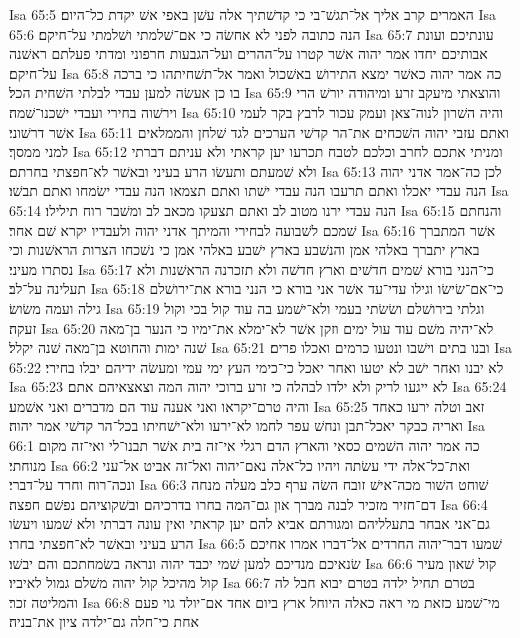 Isa 65:5  האמרים קרב אליך אל־תגשׁ־בי כי קדשׁתיך אלה עשׁן באפי אשׁ יקדת כל־היום׃
Isa 65:6  הנה כתובה לפני לא אחשׂה כי אם־שׁלמתי ושׁלמתי על־חיקם׃
Isa 65:7  עונתיכם ועונת אבותיכם יחדו אמר יהוה אשׁר קטרו על־ההרים ועל־הגבעות חרפוני ומדתי פעלתם ראשׁנה על־חיקם׃
Isa 65:8  כה אמר יהוה כאשׁר ימצא התירושׁ באשׁכול ואמר אל־תשׁחיתהו כי ברכה בו כן אעשׂה למען עבדי לבלתי השׁחית הכל׃
Isa 65:9  והוצאתי מיעקב זרע ומיהודה יורשׁ הרי וירשׁוה בחירי ועבדי ישׁכנו־שׁמה׃
Isa 65:10  והיה השׁרון לנוה־צאן ועמק עכור לרבץ בקר לעמי אשׁר דרשׁוני׃
Isa 65:11  ואתם עזבי יהוה השׁכחים את־הר קדשׁי הערכים לגד שׁלחן והממלאים למני ממסך׃
Isa 65:12  ומניתי אתכם לחרב וכלכם לטבח תכרעו יען קראתי ולא עניתם דברתי ולא שׁמעתם ותעשׂו הרע בעיני ובאשׁר לא־חפצתי בחרתם׃
Isa 65:13  לכן כה־אמר אדני יהוה הנה עבדי יאכלו ואתם תרעבו הנה עבדי ישׁתו ואתם תצמאו הנה עבדי ישׂמחו ואתם תבשׁו׃
Isa 65:14  הנה עבדי ירנו מטוב לב ואתם תצעקו מכאב לב ומשׁבר רוח תילילו׃
Isa 65:15  והנחתם שׁמכם לשׁבועה לבחירי והמיתך אדני יהוה ולעבדיו יקרא שׁם אחר׃
Isa 65:16  אשׁר המתברך בארץ יתברך באלהי אמן והנשׁבע בארץ ישׁבע באלהי אמן כי נשׁכחו הצרות הראשׁנות וכי נסתרו מעיני׃
Isa 65:17  כי־הנני בורא שׁמים חדשׁים וארץ חדשׁה ולא תזכרנה הראשׁנות ולא תעלינה על־לב׃
Isa 65:18  כי־אם־שׂישׂו וגילו עדי־עד אשׁר אני בורא כי הנני בורא את־ירושׁלם גילה ועמה משׂושׂ׃
Isa 65:19  וגלתי בירושׁלם ושׂשׂתי בעמי ולא־ישׁמע בה עוד קול בכי וקול זעקה׃
Isa 65:20  לא־יהיה משׁם עוד עול ימים וזקן אשׁר לא־ימלא את־ימיו כי הנער בן־מאה שׁנה ימות והחוטא בן־מאה שׁנה יקלל׃
Isa 65:21  ובנו בתים וישׁבו ונטעו כרמים ואכלו פרים׃
Isa 65:22  לא יבנו ואחר ישׁב לא יטעו ואחר יאכל כי־כימי העץ ימי עמי ומעשׂה ידיהם יבלו בחירי׃
Isa 65:23  לא ייגעו לריק ולא ילדו לבהלה כי זרע ברוכי יהוה המה וצאצאיהם אתם׃
Isa 65:24  והיה טרם־יקראו ואני אענה עוד הם מדברים ואני אשׁמע׃
Isa 65:25  זאב וטלה ירעו כאחד ואריה כבקר יאכל־תבן ונחשׁ עפר לחמו לא־ירעו ולא־ישׁחיתו בכל־הר קדשׁי אמר יהוה׃
Isa 66:1  כה אמר יהוה השׁמים כסאי והארץ הדם רגלי אי־זה בית אשׁר תבנו־לי ואי־זה מקום מנוחתי׃
Isa 66:2  ואת־כל־אלה ידי עשׂתה ויהיו כל־אלה נאם־יהוה ואל־זה אביט אל־עני ונכה־רוח וחרד על־דברי׃
Isa 66:3  שׁוחט השׁור מכה־אישׁ זובח השׂה ערף כלב מעלה מנחה דם־חזיר מזכיר לבנה מברך און גם־המה בחרו בדרכיהם ובשׁקוציהם נפשׁם חפצה׃
Isa 66:4  גם־אני אבחר בתעלליהם ומגורתם אביא להם יען קראתי ואין עונה דברתי ולא שׁמעו ויעשׂו הרע בעיני ובאשׁר לא־חפצתי בחרו׃
Isa 66:5  שׁמעו דבר־יהוה החרדים אל־דברו אמרו אחיכם שׂנאיכם מנדיכם למען שׁמי יכבד יהוה ונראה בשׂמחתכם והם יבשׁו׃
Isa 66:6  קול שׁאון מעיר קול מהיכל קול יהוה משׁלם גמול לאיביו׃
Isa 66:7  בטרם תחיל ילדה בטרם יבוא חבל לה והמליטה זכר׃
Isa 66:8  מי־שׁמע כזאת מי ראה כאלה היוחל ארץ ביום אחד אם־יולד גוי פעם אחת כי־חלה גם־ילדה ציון את־בניה׃
